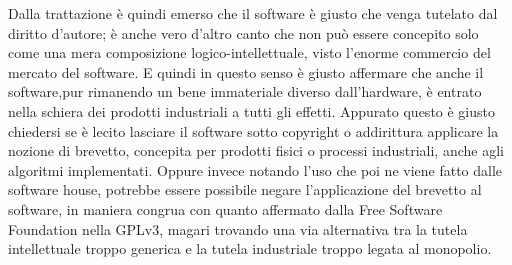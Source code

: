 Dalla trattazione è quindi emerso che il software è giusto che venga tutelato dal diritto d'autore; è anche vero d'altro canto che non può essere concepito solo come una mera composizione logico-intellettuale, visto l'enorme commercio del mercato del software. E quindi in questo senso è giusto affermare che anche il software,pur rimanendo un bene immateriale diverso dall'hardware, è entrato nella schiera dei prodotti industriali a tutti gli effetti. Appurato questo è giusto chiedersi se è lecito lasciare il software sotto copyright o addirittura applicare la nozione di brevetto, concepita per prodotti fisici o processi industriali, anche agli algoritmi implementati. Oppure invece notando l'uso che poi ne viene fatto dalle software house, potrebbe essere possibile negare l'applicazione del brevetto al software, in maniera congrua con quanto affermato dalla Free Software Foundation nella GPLv3, magari trovando una via alternativa tra la tutela intellettuale troppo generica e la tutela industriale troppo legata al monopolio.
